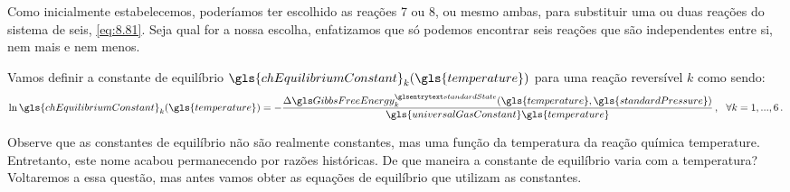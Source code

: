     Como inicialmente estabelecemos, poderíamos ter escolhido as reações 7 ou
    8, ou mesmo ambas, para substituir uma ou duas reações do sistema de seis,
    \cref{eq:8.81}. Seja qual for a nossa escolha, enfatizamos que só podemos
    encontrar seis reações que são independentes entre si, nem mais e nem
    menos.

    Vamos definir a constante de equilíbrio
    $\gls{chEquilibriumConstant}_{k}\functionOf{\gls{temperature}}$ para uma
    reação reversível $k$ como sendo:
    \begin{equation} \label{eq:8.92}
        \ln{
            \gls{chEquilibriumConstant}_k
            \functionOf{
                \gls{temperature}
            }
        }
        =
        -\frac{
            \Delta \gsuper{GibbsFreeEnergy}{standardState}_k
            \functionOf{
                \gls{temperature},
                \gls{standardPressure}
            }
        }{
            \gls{universalGasConstant}
            \gls{temperature}
        }\,,
        \,\,\,\,
        \forall k = 1,...,6\,.
    \end{equation}

    Observe que as constantes de equilíbrio não são realmente constantes, mas
    uma função da temperatura da reação química \gls{temperature}. Entretanto,
    este nome acabou permanecendo por razões históricas. De que maneira a
    constante de equilíbrio varia com a temperatura? Voltaremos a essa questão,
    mas antes vamos obter as equações de equilíbrio que utilizam as constantes.

